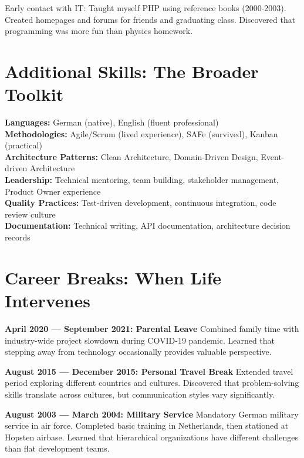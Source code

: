 \documentclass[11pt,a4paper]{article}
\begin{document}
Early contact with IT: Taught myself PHP using reference books (2000-2003). Created homepages and forums for friends and graduating class. Discovered that programming was more fun than physics homework.

\vspace{0.5em}

\section*{Additional Skills: The Broader Toolkit}

\textbf{Languages:} German (native), English (fluent professional)\\
\textbf{Methodologies:} Agile/Scrum (lived experience), SAFe (survived), Kanban (practical)\\
\textbf{Architecture Patterns:} Clean Architecture, Domain-Driven Design, Event-driven Architecture\\
\textbf{Leadership:} Technical mentoring, team building, stakeholder management, Product Owner experience\\
\textbf{Quality Practices:} Test-driven development, continuous integration, code review culture\\
\textbf{Documentation:} Technical writing, API documentation, architecture decision records

\vspace{0.5em}

\section*{Career Breaks: When Life Intervenes}

\textbf{April 2020 --- September 2021: Parental Leave}
Combined family time with industry-wide project slowdown during COVID-19 pandemic. Learned that stepping away from technology occasionally provides valuable perspective.

\textbf{August 2015 --- December 2015: Personal Travel Break}
Extended travel period exploring different countries and cultures. Discovered that problem-solving skills translate across cultures, but communication styles vary significantly.

\textbf{August 2003 --- March 2004: Military Service}
Mandatory German military service in air force. Completed basic training in Netherlands, then stationed at Hopsten airbase. Learned that hierarchical organizations have different challenges than flat development teams.
\end{document}
